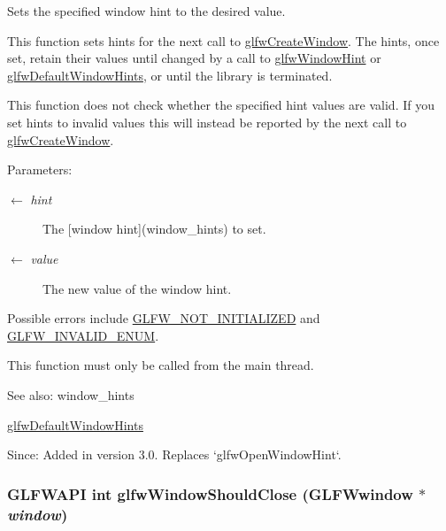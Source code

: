 Sets the specified window hint to the desired value. 

This function sets hints for the next call to \hyperlink{group__window_g680a02abe0e4494b6759d5703240713e}{glfwCreateWindow}. The hints, once set, retain their values until changed by a call to \hyperlink{group__window_g69c40728499720bef8a49aa925ea0efa}{glfwWindowHint} or \hyperlink{group__window_g8050ddceed9dc6bd9d3aa35666195cd4}{glfwDefaultWindowHints}, or until the library is terminated.

This function does not check whether the specified hint values are valid. If you set hints to invalid values this will instead be reported by the next call to \hyperlink{group__window_g680a02abe0e4494b6759d5703240713e}{glfwCreateWindow}.

\begin{Desc}
\item[Parameters:]
\begin{description}
\item[\mbox{$\leftarrow$} {\em hint}]The \mbox{[}window hint\mbox{]}(window\_\-hints) to set. \item[\mbox{$\leftarrow$} {\em value}]The new value of the window hint.\end{description}
\end{Desc}
Possible errors include \hyperlink{group__errors_g2374ee02c177f12e1fa76ff3ed15e14a}{GLFW\_\-NOT\_\-INITIALIZED} and \hyperlink{group__errors_g76f6bb9c4eea73db675f096b404593ce}{GLFW\_\-INVALID\_\-ENUM}.

This function must only be called from the main thread.

\begin{Desc}
\item[See also:]window\_\-hints 

\hyperlink{group__window_g8050ddceed9dc6bd9d3aa35666195cd4}{glfwDefaultWindowHints}\end{Desc}
\begin{Desc}
\item[Since:]Added in version 3.0. Replaces `glfwOpenWindowHint`. \end{Desc}
\hypertarget{group__window_ga6162f67dfa38b8beda2fea623649332}{
\subsubsection[glfwWindowShouldClose]{\setlength{\rightskip}{0pt plus 5cm}GLFWAPI int glfwWindowShouldClose ({\bf GLFWwindow} $\ast$ {\em window})}}
\label{group__window_ga6162f67dfa38b8beda2fea623649332}


